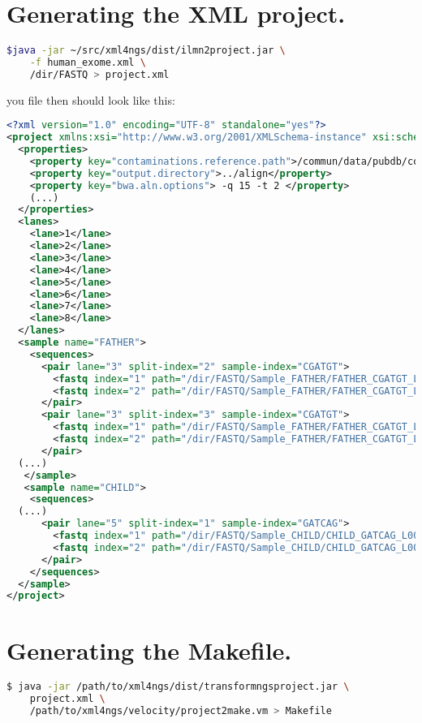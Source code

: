 \documentclass{article}
\begin{document}


\section{Generating the XML project.}

\begin{lstlisting}[language=bash]
$java -jar ~/src/xml4ngs/dist/ilmn2project.jar \
	-f human_exome.xml \
	/dir/FASTQ > project.xml
\end{lstlisting}

you file then should look like this:
\begin{lstlisting}[language=XML,breaklines=true]
<?xml version="1.0" encoding="UTF-8" standalone="yes"?>
<project xmlns:xsi="http://www.w3.org/2001/XMLSchema-instance" xsi:schemaLocation="https://raw.github.com/lindenb/xml4ngs/master/src/main/resources/xsd/project.xsd">
  <properties>
    <property key="contaminations.reference.path">/commun/data/pubdb/contaminants/contaminants.fa</property>
    <property key="output.directory">../align</property>
    <property key="bwa.aln.options"> -q 15 -t 2 </property>
    (...)
  </properties>
  <lanes>
    <lane>1</lane>
    <lane>2</lane>
    <lane>3</lane>
    <lane>4</lane>
    <lane>5</lane>
    <lane>6</lane>
    <lane>7</lane>
    <lane>8</lane>
  </lanes>
  <sample name="FATHER">
    <sequences>
      <pair lane="3" split-index="2" sample-index="CGATGT">
        <fastq index="1" path="/dir/FASTQ/Sample_FATHER/FATHER_CGATGT_L003_R1_002.fastq.gz"/>
        <fastq index="2" path="/dir/FASTQ/Sample_FATHER/FATHER_CGATGT_L003_R2_002.fastq.gz"/>
      </pair>
      <pair lane="3" split-index="3" sample-index="CGATGT">
        <fastq index="1" path="/dir/FASTQ/Sample_FATHER/FATHER_CGATGT_L003_R1_003.fastq.gz"/>
        <fastq index="2" path="/dir/FASTQ/Sample_FATHER/FATHER_CGATGT_L003_R2_003.fastq.gz"/>
      </pair>
  (...)
   </sample>
   <sample name="CHILD">
    <sequences>
  (...)
      <pair lane="5" split-index="1" sample-index="GATCAG">
        <fastq index="1" path="/dir/FASTQ/Sample_CHILD/CHILD_GATCAG_L005_R1_001.fastq.gz"/>
        <fastq index="2" path="/dir/FASTQ/Sample_CHILD/CHILD_GATCAG_L005_R2_001.fastq.gz"/>
      </pair>
    </sequences>
  </sample>
</project>
\end{lstlisting}


\section{Generating the Makefile.}
\begin{lstlisting}[language=bash]
$ java -jar /path/to/xml4ngs/dist/transformngsproject.jar \
 	project.xml \
 	/path/to/xml4ngs/velocity/project2make.vm > Makefile
\end{lstlisting}
\end{document}

